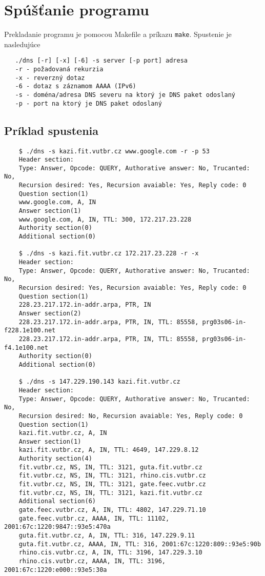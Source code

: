 \documentclass[titlepage]{article}
\begin{document}
\newpage
\section{Spúšťanie programu}
Prekladanie programu je pomocou Makefile a príkazu \verb|make|.
Spustenie je nasledujúce
\begin{verbatim}
   ./dns [-r] [-x] [-6] -s server [-p port] adresa 
   -r - požadovaná rekurzia
   -x - reverzný dotaz
   -6 - dotaz s záznamom AAAA (IPv6)
   -s - doména/adresa DNS severu na ktorý je DNS paket odoslaný 
   -p - port na ktorý je DNS paket odoslaný
\end{verbatim}
\subsection{Príklad spustenia}
\begin{verbatim}
    $ ./dns -s kazi.fit.vutbr.cz www.google.com -r -p 53
    Header section:
    Type: Answer, Opcode: QUERY, Authorative answer: No, Trucanted: No, 
    Recursion desired: Yes, Recursion avaiable: Yes, Reply code: 0 
    Question section(1)
    www.google.com, A, IN 
    Answer section(1) 
    www.google.com, A, IN, TTL: 300, 172.217.23.228
    Authority section(0) 
    Additional section(0) 

    $ ./dns -s kazi.fit.vutbr.cz 172.217.23.228 -r -x
    Header section:
    Type: Answer, Opcode: QUERY, Authorative answer: No, Trucanted: No, 
    Recursion desired: Yes, Recursion avaiable: Yes, Reply code: 0 
    Question section(1)
    228.23.217.172.in-addr.arpa, PTR, IN 
    Answer section(2) 
    228.23.217.172.in-addr.arpa, PTR, IN, TTL: 85558, prg03s06-in-f228.1e100.net
    228.23.217.172.in-addr.arpa, PTR, IN, TTL: 85558, prg03s06-in-f4.1e100.net
    Authority section(0) 
    Additional section(0) 

    $ ./dns -s 147.229.190.143 kazi.fit.vutbr.cz
    Header section:
    Type: Answer, Opcode: QUERY, Authorative answer: No, Trucanted: No,
    Recursion desired: No, Recursion avaiable: Yes, Reply code: 0 
    Question section(1)
    kazi.fit.vutbr.cz, A, IN 
    Answer section(1) 
    kazi.fit.vutbr.cz, A, IN, TTL: 4649, 147.229.8.12
    Authority section(4) 
    fit.vutbr.cz, NS, IN, TTL: 3121, guta.fit.vutbr.cz
    fit.vutbr.cz, NS, IN, TTL: 3121, rhino.cis.vutbr.cz
    fit.vutbr.cz, NS, IN, TTL: 3121, gate.feec.vutbr.cz
    fit.vutbr.cz, NS, IN, TTL: 3121, kazi.fit.vutbr.cz
    Additional section(6) 
    gate.feec.vutbr.cz, A, IN, TTL: 4802, 147.229.71.10
    gate.feec.vutbr.cz, AAAA, IN, TTL: 11102, 2001:67c:1220:9847::93e5:470a
    guta.fit.vutbr.cz, A, IN, TTL: 316, 147.229.9.11
    guta.fit.vutbr.cz, AAAA, IN, TTL: 316, 2001:67c:1220:809::93e5:90b
    rhino.cis.vutbr.cz, A, IN, TTL: 3196, 147.229.3.10
    rhino.cis.vutbr.cz, AAAA, IN, TTL: 3196, 2001:67c:1220:e000::93e5:30a
\end{verbatim}
\end{document}
